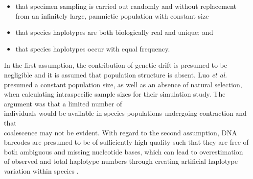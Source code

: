 \begin{itemize}

\item that specimen sampling is carried out randomly and without replacement from an infinitely large, panmictic population with constant size

\vspace{1mm}

\item that species haplotypes are both biologically real and unique; and

\vspace{1mm}

\item that species haplotypes occur with equal frequency.

\end{itemize}

\vspace{5mm}

In the first assumption, the contribution of genetic drift is presumed to be negligible and it is assumed that population structure is absent. Luo \textit{et al.} \cite{luo2015simulation} presumed a constant population size, as well as an absence of natural selection, when calculating intraspecific sample sizes for their simulation study. The argument was that a limited number of \\ individuals would be available in species populations undergoing contraction and that \\ coalescence may not be evident. With regard to the second assumption, DNA barcodes are presumed to be of sufficiently high quality such that they are free of both ambiguous and missing nucleotide bases, which can lead to overestimation of observed and total haplotype numbers through creating artificial haplotype variation within species \cite{athey2013assessing, dasmahapatra2010mitochondrial, phillips2015exploration, stoeckle2012frequency, stoeckle2014dna}.

\vspace{5mm}


